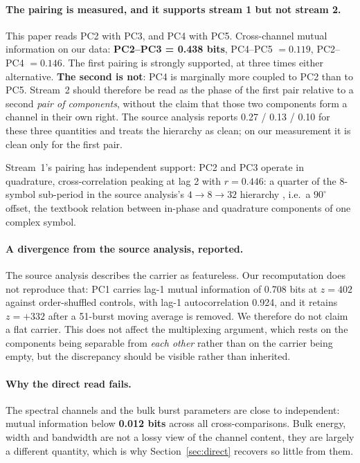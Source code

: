 \documentclass[11pt,a4paper]{article}
\begin{document}
\paragraph{The pairing is measured, and it supports stream 1 but not stream 2.}
This paper reads PC2 with PC3, and PC4 with PC5. Cross-channel mutual information on our
data: \textbf{PC2--PC3 = 0.438 bits}, PC4--PC5 $= 0.119$, PC2--PC4 $= 0.146$. The first
pairing is strongly supported, at three times either alternative. \textbf{The second is
not}: PC4 is marginally more coupled to PC2 than to PC5. Stream~2 should therefore be
read as the phase of the first pair relative to a second \emph{pair of components},
without the claim that those two components form a channel in their own right. The
source analysis reports 0.27 / 0.13 / 0.10 for these three quantities and treats the
hierarchy as clean; on our measurement it is clean only for the first pair.

Stream~1's pairing has independent support: PC2 and PC3 operate in quadrature,
cross-correlation peaking at lag 2 with $r = 0.446$: a quarter of the 8-symbol
sub-period in the source analysis's $4 \rightarrow 8 \rightarrow 32$ hierarchy
\cite{meucci2026}, i.e.\ a $90^\circ$ offset, the textbook relation between in-phase
and quadrature components of one complex symbol.

\paragraph{A divergence from the source analysis, reported.} The source analysis
\cite{meucci2026} describes the carrier as featureless. Our recomputation does not
reproduce that: PC1 carries lag-1 mutual information of 0.708 bits at $z = 402$ against
order-shuffled controls, with lag-1 autocorrelation 0.924, and it retains $z = +332$
after a 51-burst moving average is removed. We therefore do not claim a flat
carrier. This does not affect the multiplexing argument, which rests on the components
being separable from \emph{each other} rather than on the carrier being empty, but the
discrepancy should be visible rather than inherited.

\paragraph{Why the direct read fails.} The spectral channels and the bulk burst
parameters are close to independent: mutual information below \textbf{0.012 bits} across
all cross-comparisons. Bulk energy, width and bandwidth are not a lossy view of the
channel content, they are largely a different quantity, which is why
Section~\ref{sec:direct} recovers so little from them.
\end{document}
